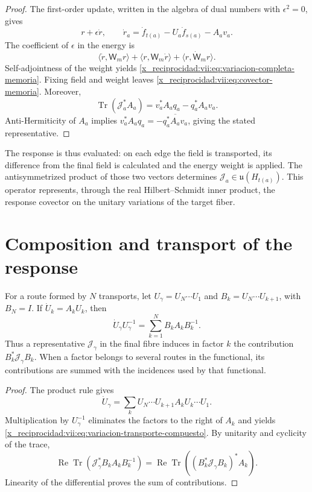 \begin{proof}
The first-order update, written in the algebra of dual
numbers with \(\epsilon^2=0\), gives
\[
 r+\epsilon\dot r,\qquad
 \dot r_a=\dot f_{t(a)}-U_a\dot f_{s(a)}-A_av_a.
\]
The coefficient of \(\epsilon\) in the energy is
\[
 \langle\dot r,\mathsf W_mr\rangle+
 \langle r,\mathsf W_m\dot r\rangle+
 \langle r,\dot{\mathsf W}_mr\rangle.
\]
Self-adjointness of the weight yields
\eqref{x_reciprocidad:vii:eq:variacion-completa-memoria}. Fixing field and weight leaves
\eqref{x_reciprocidad:vii:eq:covector-memoria}. Moreover,
\[
 \operatorname{Tr}(\mathcal J_a^*A_a)
 =v_a^*A_aq_a-q_a^*A_av_a.
\]
Anti-Hermiticity of \(A_a\) implies
\(v_a^*A_aq_a=-\overline{q_a^*A_av_a}\), giving
the stated representative.
\end{proof}

The response is thus evaluated: on each edge the field is transported,
its difference from the final field is calculated and the energy weight is applied.
The antisymmetrized product of those two vectors determines
\(\mathcal J_a\in\mathfrak u(H_{t(a)})\). This operator represents,
through the real Hilbert--Schmidt inner product, the response covector
on the unitary variations of the target fiber.

\section{Composition and transport of the response}
\label{x_reciprocidad:vii:subsec:composicion-respuesta}

\begin{proposition}
\label{x_reciprocidad:vii:prop:composicion-respuesta}
For a route formed by \(N\) transports, let
\(U_\gamma=U_N\cdots U_1\) and
\(B_k=U_N\cdots U_{k+1}\), with \(B_N=I\).
If \(\dot U_k=A_kU_k\), then
\begin{equation}
 \dot U_\gamma U_\gamma^{-1}
 =\sum_{k=1}^N B_kA_kB_k^{-1}.
 \label{x_reciprocidad:vii:eq:variacion-transporte-compuesto}
\end{equation}
Thus a representative \(\mathcal J_\gamma\) in the final fibre
induces in factor \(k\) the contribution
\(B_k^*\mathcal J_\gamma B_k\). When a factor belongs to several
routes in the functional, its contributions are summed with the incidences
used by that functional.
\end{proposition}

\begin{proof}
The product rule gives
\[
 \dot U_\gamma=\sum_k
 U_N\cdots U_{k+1}A_kU_k\cdots U_1.
\]
Multiplication by \(U_\gamma^{-1}\) eliminates the factors to the right
of \(A_k\) and yields \eqref{x_reciprocidad:vii:eq:variacion-transporte-compuesto}.
By unitarity and cyclicity of the trace,
\[
 \operatorname{Re}\operatorname{Tr}
   (\mathcal J_\gamma^*B_kA_kB_k^{-1})
 =\operatorname{Re}\operatorname{Tr}
   ((B_k^*\mathcal J_\gamma B_k)^*A_k).
\]
Linearity of the differential proves the sum of contributions.
\end{proof}

